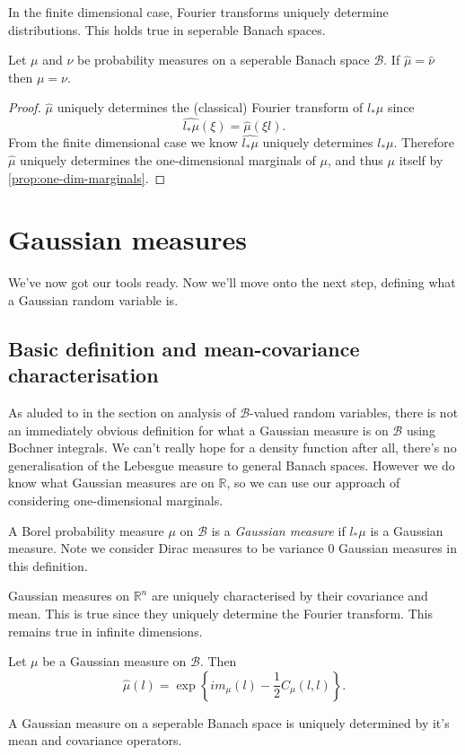 \documentclass[fontsize=12pt, DIV=12]{scrreprt}
\newcommand{\R}{\mathbb R}
\newcommand{\calB}{\mathcal B}
\begin{document}
In the finite dimensional case, Fourier transforms uniquely determine distributions. This holds true in seperable Banach spaces.
\begin{prop}
	Let $\mu$ and $\nu$ be probability measures on a seperable Banach space $\calB$. If $\hat{\mu} = \hat{\nu}$ then $\mu = \nu$.
\end{prop}
\begin{proof}
	$\hat{\mu}$ uniquely determines the (classical) Fourier transform of $l_* \mu$ since
	\begin{equation}
		\widehat{l_* \mu}(\xi) = \hat{\mu}(\xi l).
	\end{equation}
	From the finite dimensional case we know $\widehat{l_* \mu}$ uniquely determines $l_* \mu$. Therefore $\hat{\mu}$ uniquely determines the one-dimensional marginals of $\mu$, and thus $\mu$ itself by \vref{prop:one-dim-marginals}.
\end{proof}

\section{Gaussian measures}

We've now got our tools ready. Now we'll move onto the next step, defining what a Gaussian random variable is.

\subsection{Basic definition and mean-covariance characterisation}

As aluded to in the section on analysis of $\calB$-valued random variables, there is not an immediately obvious definition for what a Gaussian measure is on $\calB$ using Bochner integrals. We can't really hope for a density function after all, there's no generalisation of the Lebesgue measure to general Banach spaces. However we do know what Gaussian measures are on $\R$, so we can use our approach of considering one-dimensional marginals.
\begin{defn}
	A Borel probability measure $\mu$ on $\calB$ is a \emph{Gaussian measure} if $l_* \mu$ is a Gaussian measure. Note we consider Dirac measures to be variance 0 Gaussian measures in this definition.
\end{defn}

Gaussian measures on $\R^n$ are uniquely characterised by their covariance and mean. This is true since they uniquely determine the Fourier transform. This remains true in infinite dimensions.
\begin{prop}
	Let $\mu$ be a Gaussian measure on $\calB$. Then
	\begin{equation}
		\hat{\mu}(l) = \exp\left\{i m_{\mu}(l) - \frac{1}{2} C_{\mu}(l, l) \right\}.
	\end{equation}
\end{prop}
\begin{corollary}
	A Gaussian measure on a seperable Banach space is uniquely determined by it's mean and covariance operators.
\end{corollary}
\end{document}
